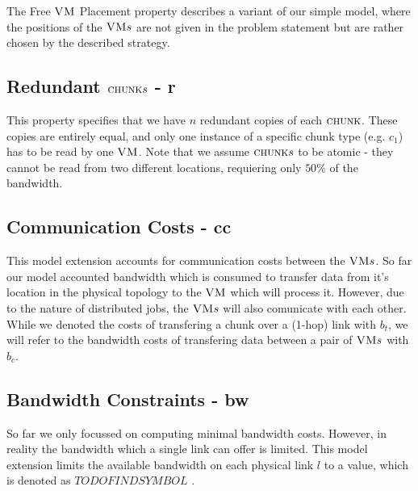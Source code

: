 The Free $\textsc{VM}$ Placement property describes a variant of our simple model, where the positions of the $\textsc{VM} s$ are not given in the problem statement but are rather chosen by the described strategy. 

\subsection{Redundant $\textsc{chunk} s$ - r}

This property specifies that we have $n$ redundant copies of each $\textsc{chunk}$. These copies are entirely equal, and only one instance of a specific chunk type (e.g. $c_1$) has to be read by one $\textsc{VM}$. Note that we assume $\textsc{chunk} s$ to be atomic - they cannot be read from two different locations, requiering only $50\%$ of the bandwidth.

\subsection{Communication Costs - cc}

This model extension accounts for communication costs between the $\textsc{VM} s$. So far our model accounted bandwidth which is consumed to transfer data from it's location in the physical topology to the $\textsc{VM}$ which will process it. However, due to the nature of distributed jobs, the $\textsc{VM} s$ will also comunicate with each other. While we denoted the costs of transfering a chunk over a (1-hop) link with $b_t$, we will refer to the bandwidth costs of transfering data between a pair of $\textsc{VM} s$ with $b_c$.

\subsection{Bandwidth Constraints - bw}

So far we only focussed on computing minimal bandwidth costs. However, in reality the bandwidth which a single link can offer is limited. This model extension limits the available bandwidth on each physical link $l$ to a value, which is denoted as $TODO FIND SYMBOL$ .
